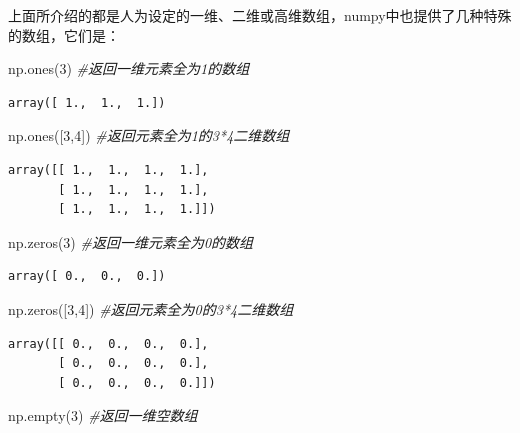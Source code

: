\documentclass[]{article}
\newenvironment{Shaded}{\begin{snugshade}}{\end{snugshade}}
\newcommand{\DecValTok}[1]{\textcolor[rgb]{0.00,0.00,0.81}{#1}}
\newcommand{\CommentTok}[1]{\textcolor[rgb]{0.56,0.35,0.01}{\textit{#1}}}
\newcommand{\NormalTok}[1]{#1}
\begin{document}
上面所介绍的都是人为设定的一维、二维或高维数组，numpy中也提供了几种特殊的数组，它们是：

\begin{Shaded}
\begin{Highlighting}[]
\NormalTok{np.ones(}\DecValTok{3}\NormalTok{) }\CommentTok{#返回一维元素全为1的数组}
\end{Highlighting}
\end{Shaded}

\begin{verbatim}
array([ 1.,  1.,  1.])
\end{verbatim}

\begin{Shaded}
\begin{Highlighting}[]
\NormalTok{np.ones([}\DecValTok{3}\NormalTok{,}\DecValTok{4}\NormalTok{]) }\CommentTok{#返回元素全为1的3*4二维数组}
\end{Highlighting}
\end{Shaded}

\begin{verbatim}
array([[ 1.,  1.,  1.,  1.],
       [ 1.,  1.,  1.,  1.],
       [ 1.,  1.,  1.,  1.]])
\end{verbatim}

\begin{Shaded}
\begin{Highlighting}[]
\NormalTok{np.zeros(}\DecValTok{3}\NormalTok{) }\CommentTok{#返回一维元素全为0的数组}
\end{Highlighting}
\end{Shaded}

\begin{verbatim}
array([ 0.,  0.,  0.])
\end{verbatim}

\begin{Shaded}
\begin{Highlighting}[]
\NormalTok{np.zeros([}\DecValTok{3}\NormalTok{,}\DecValTok{4}\NormalTok{]) }\CommentTok{#返回元素全为0的3*4二维数组}
\end{Highlighting}
\end{Shaded}

\begin{verbatim}
array([[ 0.,  0.,  0.,  0.],
       [ 0.,  0.,  0.,  0.],
       [ 0.,  0.,  0.,  0.]])
\end{verbatim}

\begin{Shaded}
\begin{Highlighting}[]
\NormalTok{np.empty(}\DecValTok{3}\NormalTok{) }\CommentTok{#返回一维空数组}
\end{Highlighting}
\end{Shaded}
\end{document}

